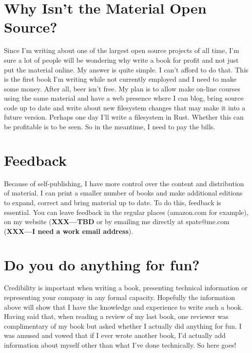 
\section{Why Isn't the Material Open Source?}

Since I'm writing about one of the largest open source projects of all time, I'm sure a lot of people will be wondering why write a book for profit and not just put the material online. My answer is quite simple. I can't afford to do that. This is the first book I'm writing while not currently employed and I need to make some money. After all, beer isn't free. My plan is to allow make on-line courses using the same material and have a web presence where I can blog, bring source code up to date and write about new filesystem changes that may make it into a future version. Perhaps one day I'll write a filesystem in Rust. Whether this can be profitable is to be seen. So in the meantime, I need to pay the bills. 


\section{Feedback}

Because of self-publishing, I have more control over the content and distribution of material. I can print a smaller number of books and make additional editions to expand, correct and bring material up to date. To do this, feedback is essential. You can leave feedback in the regular places (amazon.com for example), on my website ({\bfseries XXX---TBD} or by emailing me directly at spate@me.com ({\bfseries XXX---I need a work email address}).


\section{Do you do anything for fun?}

Credibility is important when writing a book, presenting technical information or representing your company in any formal capacity. Hopefully the information above will show that I have the knowledge and experience to write such a book. Having said that, when reading a review of my last book, one reviewer was complimentary of my book but asked whether I actually did anything for fun. I was amused and vowed that if I ever wrote another book, I'd actually add information about myself other than what I've done technically. So here goes!

